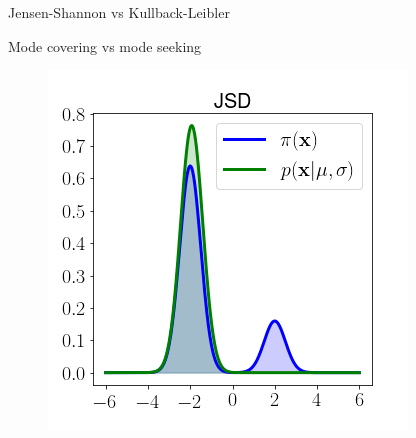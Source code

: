 \begin{frame}{Jensen-Shannon vs Kullback-Leibler }
\begin{block}{Mode covering vs mode seeking}
\begin{minipage}[t]{0.33\columnwidth}
\begin{figure}
			\end{figure}
		\end{minipage}%
		\begin{minipage}[t]{0.33\columnwidth}
			\begin{figure}
				\includegraphics[width=\linewidth]{figs/JSD}
			\end{figure}
		\end{minipage}
		\vspace{-0.3cm}
	\end{block}
\end{frame}
